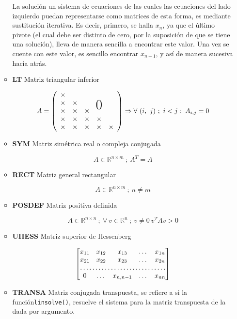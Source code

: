 \documentclass[11pt, spanish]{article}
\newcommand\x{\times}
\newcommand\bigzero{\makebox(0,0){\text{\huge0}}}
\begin{document}
\begin{enumerate}
\begin{itemize}
La solución un sistema de ecuaciones de las cuales las ecuaciones del lado izquierdo puedan representarse como matrices de esta forma, es mediante sustitución iterativa. Es decir, primero, se halla $x_n$, ya que el último pivote (el cual debe ser distinto de cero, por la suposición de que se tiene una solución), lleva de manera sencilla a encontrar este valor. Una vez se cuente con este valor, es sencillo encontrar $x_{n-1}$, y así de manera sucesiva hacia atrás.

\item \textbf{LT} Matriz triangular inferior

$$ A = 
  \left(
    \begin{array}{ccccc}
    \x &      &     &    &					\\
    \x & \x  &     &   \bigzero &              	\\
    \x & \x & \x &		&  	\\
    \x & \x & \x & \x &     			\\
    \x & \x & \x & \x & \x
  \end{array}\right) \Rightarrow \forall\ (i,\ j)\ ;\  i < j\ ;\ A_{i,j} = 0
$$

\item \textbf{SYM} Matriz simétrica real o compleja conjugada

$$A \in \mathbb{R}^{n \times m}\ ;\ A^T = A$$

\item \textbf{RECT} Matriz general rectangular

$$A \in \mathbb{R}^{n \times m}\ ;\ n \neq m$$

\item \textbf{POSDEF} Matriz positiva definida

$$A \in \mathbb{R}^{n \times n}\ ;\ \forall\ v \in \mathbb{R}^n\ ;\ v \neq 0\ v^{T}Av > 0$$

\item \textbf{UHESS} Matriz superior de Hessenberg

\[
\begin{bmatrix}
    x_{11}       & x_{12} & x_{13} & \dots & x_{1n} \\
    x_{21}       & x_{22} & x_{23} & \dots & x_{2n} \\
    \hdotsfor{5} \\
     0 & \dots       & x_{n, n-1} & \dots & x_{nn}
\end{bmatrix}
\]

\item \textbf{TRANSA} Matriz conjugada transpuesta, se refiere a si la función\texttt{linsolve()}, resuelve el sistema para la matriz transpuesta de la dada por argumento.


\end{itemize}
\end{enumerate}
\end{document}
